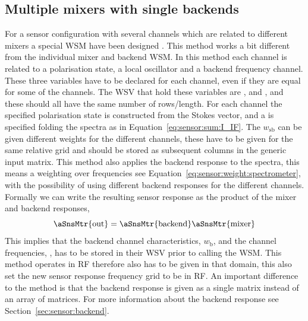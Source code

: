 \subsection{Multiple mixers with single backends}
For a sensor configuration with several channels which are related to
different mixers a special WSM have been designed
.  This method works a
bit different from the individual mixer and backend WSM. In this
method each channel is related to a polarisation state, a local
oscillator and a backend frequency channel. These three variables have
to be declared for each channel, even if they are equal for some of
the channels.
The WSV that hold these variables are ,
 and , and these should all have
the same number of rows/length.  For each channel the specified
polarisation state is constructed from the Stokes vector, and a
 is specified folding the spectra as in
Equation~\ref{eq:sensor:sum:I_IF}. The $w_\mathrm{sb}$ can be given
different weights for the different channels, these have to be given
for the same relative grid and should be stored as subsequent columns
in the generic input matrix.  This method also applies the backend
response to the spectra, this means a weighting over frequencies see
Equation~\ref{eq:sensor:weight:spectrometer}, with the possibility of
using different backend responses for the different channels. Formally
we can write the resulting sensor response as the product of the mixer
and backend responses,
\begin{equation}
\aSnsMtr{\mathrm{out}} = \aSnsMtr{\mathrm{backend}} \aSnsMtr{\mathrm{mixer}}
\end{equation}
This implies that the backend channel characteristics, $w_\mathrm{b}$,
and the channel frequencies, , has to be stored in
their WSV prior to calling the WSM. This method operates in RF
therefore  also has to be given in that domain, this
also set the new sensor response frequency grid to be in RF. An
important difference to the  method
is that the backend response is given as a single matrix instead of an
array of matrices. For more information about the backend response see
Section~\ref{sec:sensor:backend}.

